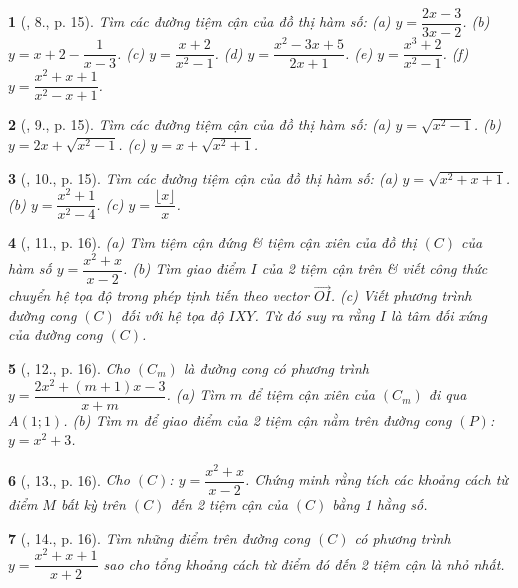\documentclass{article}
\newtheorem{baitoan}{}
\begin{document}
\begin{baitoan}[\cite{TLCT_giai_tich_12}, 8., p. 15]
	Tìm các đường tiệm cận của đồ thị hàm số: (a) $y = \dfrac{2x - 3}{3x - 2}$. (b) $y = x + 2 - \dfrac{1}{x - 3}$. (c) $y = \dfrac{x + 2}{x^2 - 1}$. (d) $y = \dfrac{x^2 - 3x + 5}{2x + 1}$. (e) $y = \dfrac{x^3 + 2}{x^2 - 1}$. (f) $y = \dfrac{x^2 + x + 1}{x^2 - x + 1}$.	
\end{baitoan}

\begin{baitoan}[\cite{TLCT_giai_tich_12}, 9., p. 15]
	Tìm các đường tiệm cận của đồ thị hàm số: (a) $y = \sqrt{x^2 - 1}$. (b) $y = 2x + \sqrt{x^2 - 1}$. (c) $y = x + \sqrt{x^2 + 1}$.	
\end{baitoan}

\begin{baitoan}[\cite{TLCT_giai_tich_12}, 10., p. 15]
	Tìm các đường tiệm cận của đồ thị hàm số: (a) $y = \sqrt{x^2 + x + 1}$. (b) $y = \dfrac{x^2 + 1}{x^2 - 4}$. (c) $y = \dfrac{\lfloor x\rfloor}{x}$.	
\end{baitoan}

\begin{baitoan}[\cite{TLCT_giai_tich_12}, 11., p. 16]	
	(a) Tìm tiệm cận đứng \& tiệm cận xiên của đồ thị $(C)$ của hàm số $y = \dfrac{x^2 + x}{x - 2}$. (b) Tìm giao điểm $I$ của 2 tiệm cận trên \& viết công thức chuyển hệ tọa độ trong phép tịnh tiến theo vector $\overrightarrow{OI}$. (c) Viết phương trình đường cong $(C)$ đối với hệ tọa độ $IXY$. Từ đó suy ra rằng $I$ là tâm đối xứng của đường cong $(C)$.
\end{baitoan}

\begin{baitoan}[\cite{TLCT_giai_tich_12}, 12., p. 16]
	Cho $(C_m)$ là đường cong có phương trình $y = \dfrac{2x^2 + (m + 1)x - 3}{x + m}$. (a) Tìm $m$ để tiệm cận xiên của $(C_m)$ đi qua $A(1;1)$. (b) Tìm $m$ để giao điểm của 2 tiệm cận nằm trên đường cong $(P)$: $y = x^2 + 3$.	
\end{baitoan}

\begin{baitoan}[\cite{TLCT_giai_tich_12}, 13., p. 16]
	Cho $(C)$: $y = \dfrac{x^2 + x}{x - 2}$. Chứng minh rằng tích các khoảng cách từ điểm $M$ bất kỳ trên $(C)$ đến 2 tiệm cận của $(C)$ bằng 1 hằng số.
\end{baitoan}

\begin{baitoan}[\cite{TLCT_giai_tich_12}, 14., p. 16]
	Tìm những điểm trên đường cong $(C)$ có phương trình $y = \dfrac{x^2 + x + 1}{x + 2}$ sao cho tổng khoảng cách từ điểm đó đến 2 tiệm cận là nhỏ nhất.
\end{baitoan}
\end{document}
